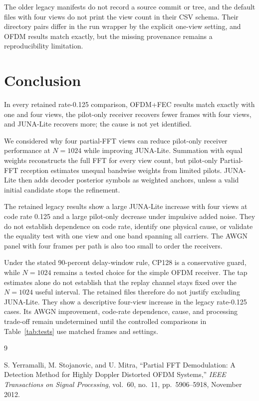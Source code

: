 \documentclass[11pt]{article}
\begin{document}
The older legacy manifests do not record a source commit or tree, and the
default files with four views do not print the view count in their CSV schema.
Their directory pairs differ in the run wrapper by the explicit one-view
setting, and OFDM results match exactly, but the missing provenance remains a
reproducibility limitation.

\section{Conclusion}

In every retained rate-0.125 comparison, OFDM+FEC results match exactly with
one and four views, the pilot-only receiver recovers fewer frames with four
views, and JUNA-Lite recovers more; the cause is not yet identified.

We considered why four partial-FFT views can reduce pilot-only receiver
performance at $N=1024$ while improving JUNA-Lite.  Summation with equal weights
reconstructs the full FFT for every view count, but pilot-only Partial-FFT
reception estimates unequal bandwise weights from limited pilots.  JUNA-Lite
then adds decoder posterior symbols as weighted anchors, unless a valid initial
candidate stops the refinement.

The retained legacy results show a large JUNA-Lite increase with four views at code
rate 0.125 and a large pilot-only decrease under impulsive added noise.  They
do not establish dependence on code rate, identify one physical cause, or
validate the equality test with one view and one band spanning all carriers.
The AWGN panel with four frames per path is also too small to order the receivers.

Under the stated 90-percent delay-window rule, CP128 is a conservative guard,
while $N=1024$ remains a tested choice for the simple OFDM receiver.  The tap
estimates alone do not establish that the replay channel stays fixed over the
$N=1024$ useful interval.
The retained files therefore do not justify excluding JUNA-Lite.  They show a
descriptive four-view increase in the legacy rate-0.125 cases.  Its AWGN
improvement, code-rate dependence, cause, and processing trade-off remain
undetermined until the controlled comparisons in Table~\ref{tab:tests} use
matched frames and settings.

\begin{thebibliography}{9}

S. Yerramalli, M. Stojanovic, and U. Mitra,
``Partial FFT Demodulation: A Detection Method for Highly Doppler Distorted
OFDM Systems,''
\emph{IEEE Transactions on Signal Processing}, vol.~60, no.~11,
pp.~5906--5918, November 2012.

\end{thebibliography}
\end{document}
